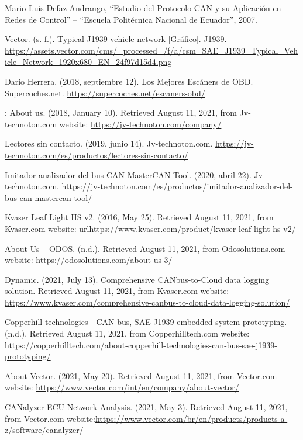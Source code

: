 \begin{thebibliography}{99}

 Mario Luis Defaz Andrango, “Estudio del Protocolo CAN y su Aplicación en Redes de Control” – “Escuela Politécnica Nacional de Ecuador”, 2007.

 Vector. (s. f.). Typical J1939 vehicle network [Gráfico]. J1939. \url{https://assets.vector.com/cms/_processed_/f/a/csm_SAE_J1939_Typical_Vehicle_Network_1920x680_EN_24f97d15d4.png}


 Dario Herrera. (2018, septiembre 12). Los Mejores Escáners de OBD. Supercoches.net. \url{https://supercoches.net/escaners-obd/}

 : About us. (2018, January 10). Retrieved August 11, 2021, from Jv-technoton.com website: \url{https://jv-technoton.com/company/}


Lectores sin contacto. (2019, junio 14). Jv-technoton.com. \url{https://jv-technoton.com/es/productos/lectores-sin-contacto/}

Imitador-analizador del bus CAN MasterCAN Tool. (2020, abril 22). Jv-technoton.com. \url{https://jv-technoton.com/es/productos/imitador-analizador-del-bus-can-mastercan-tool/}

 Kvaser Leaf Light HS v2. (2016, May 25). Retrieved August 11, 2021, from Kvaser.com website: url{https://www.kvaser.com/product/kvaser-leaf-light-hs-v2/}

  About Us – ODOS. (n.d.). Retrieved August 11, 2021, from Odosolutions.com website: \url{https://odosolutions.com/about-us-3/}

 Dynamic. (2021, July 13). Comprehensive CANbus-to-Cloud data logging solution. Retrieved August 11, 2021, from Kvaser.com website: \url{ https://www.kvaser.com/comprehensive-canbus-to-cloud-data-logging-solution/}

Copperhill technologies - CAN bus, SAE J1939 embedded system prototyping. (n.d.). Retrieved August 11, 2021, from Copperhilltech.com website:\url{ https://copperhilltech.com/about-copperhill-technologies-can-bus-sae-j1939-prototyping/}

 About Vector. (2021, May 20). Retrieved August 11, 2021, from Vector.com website: \url{https://www.vector.com/int/en/company/about-vector/}

 CANalyzer ECU Network Analysis. (2021, May 3). Retrieved August 11, 2021, from Vector.com website:\url{https://www.vector.com/br/en/products/products-a-z/software/canalyzer/}


\end{thebibliography}
